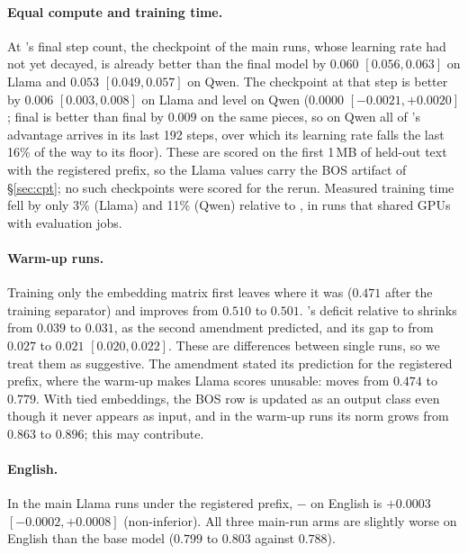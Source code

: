 

\paragraph{Equal compute and training time.} At \RII{}'s final step count, the \RO{} checkpoint of the main runs, whose learning rate had not yet decayed, is already better than the final \RII{} model by $0.060$ $[0.056, 0.063]$ on Llama and $0.053$ $[0.049, 0.057]$ on Qwen. The \RI{} checkpoint at that step is better by $0.006$ $[0.003, 0.008]$ on Llama and level on Qwen ($0.0000$ $[-0.0021, +0.0020]$; final \RI{} is better than final \RII{} by $0.009$ on the same pieces, so on Qwen all of \RI{}'s advantage arrives in its last 192 steps, over which its learning rate falls the last 16\% of the way to its floor). These are scored on the first 1\,MB of held-out text with the registered prefix, so the Llama values carry the BOS artifact of \S\ref{sec:cpt}; no such checkpoints were scored for the rerun. Measured training time fell by only 3\% (Llama) and 11\% (Qwen) relative to \RI{}, in runs that shared GPUs with evaluation jobs.

\paragraph{Warm-up runs.} Training only the embedding matrix first leaves \RO{} where it was ($0.471$ after the training separator) and improves \RII{} from $0.510$ to $0.501$. \RII{}'s deficit relative to \RO{} shrinks from $0.039$ to $0.031$, as the second amendment predicted, and its gap to \RI{} from $0.027$ to $0.021$ $[0.020, 0.022]$. These are differences between single runs, so we treat them as suggestive. The amendment stated its prediction for the registered prefix, where the warm-up makes Llama scores unusable: \RO{} moves from $0.474$ to $0.779$. With tied embeddings, the BOS row is updated as an output class even though it never appears as input, and in the warm-up runs its norm grows from $0.863$ to $0.896$; this may contribute.

\paragraph{English.} In the main Llama runs under the registered prefix, \RII{} $-$ \RO{} on English is $+0.0003$ $[-0.0002, +0.0008]$ (non-inferior). All three main-run arms are slightly worse on English than the base model ($0.799$ to $0.803$ against $0.788$).

